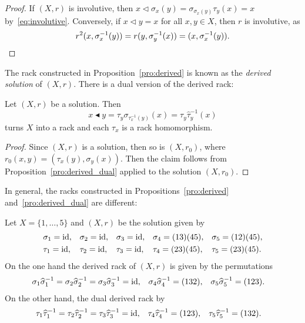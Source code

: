 \begin{proof}
    If $(X,r)$ is involutive, 
    then $x\triangleleft\sigma_x(y)=\sigma_{\sigma_x(y)}\tau_y(x)=x$ by~\eqref{eq:involutive}. 
    Conversely, if $x\triangleleft y=x$ for all $x,y\in X$,
    then $r$ is involutive, as 
    \[
    r^2(x,\sigma_x^{-1}(y))=r(y,\sigma_y^{-1}(x))=(x,\sigma_x^{-1}(y)).\qedhere
    \]
\end{proof}

The rack constructed in Proposition~\ref{pro:derived} is 
known as the \emph{derived solution} of $(X,r)$. 
There is a dual version of the derived rack:

\begin{proposition}
    \label{pro:derived_dual}
    Let $(X,r)$ be a solution. Then 
    \[
    x\blacktriangleleft y=\tau_y\sigma_{\tau_x^{-1}(y)}(x)=\tau_y\widehat{\tau}^{-1}_y(x)
    \]
    turns $X$ into a rack and each $\tau_x$ is a rack homomorphism. 
\end{proposition}

\begin{proof}
    Since $(X,r)$ is a solution, then so is $(X,r_0)$, where 
    $r_0(x,y)=(\tau_x(y),\sigma_y(x))$. Then the claim follows 
    from Proposition~\ref{pro:derived_dual} applied to 
    the solution $(X,r_0)$.
\end{proof}

In general, the racks constructed in Propositions~\ref{pro:derived} 
and~\ref{pro:derived_dual} are different:

\begin{example}
Let $X=\{1,\dots,5\}$ and $(X,r)$ be the solution given by
\begin{align*}
&\sigma_1=\operatorname{id}, && \sigma_2=\operatorname{id}, && \sigma_3=\operatorname{id}, && \sigma_4=(13)(45), &&\sigma_5=(12)(45),\\
&\tau_1=\operatorname{id}, && \tau_2=\operatorname{id}, && \tau_3=\operatorname{id}, && \tau_4=(23)(45), &&\tau_5=(23)(45).
\end{align*}
On the one hand the derived rack of $(X,r)$ is given by the permutations 
\begin{align*}
&\sigma_1\widehat{\sigma}_1^{-1}=\sigma_2\widehat{\sigma}_2^{-1}=\sigma_3\widehat{\sigma}_3^{-1}=\operatorname{id},
&&\sigma_4\widehat{\sigma}_4^{-1}=(132),
&&\sigma_5\widehat{\sigma}_5^{-1}=(123).
\end{align*}
On the other hand, the dual derived rack by 
\begin{align*}
&\tau_1\widehat{\tau}_1^{-1}=\tau_2\widehat{\tau}_2^{-1}=\tau_3\widehat{\tau}_3^{-1}=\operatorname{id},
&&\tau_4\widehat{\tau}_4^{-1}=(123),
&&\tau_5\widehat{\tau}_5^{-1}=(132).
\end{align*}
\end{example}

